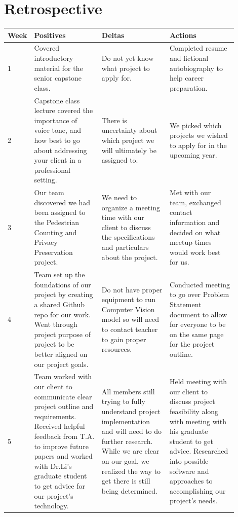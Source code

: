 \documentclass[onecolumn, draftclsnofoot,10pt, compsoc]{IEEEtran}
\begin{document}
\section{Retrospective}
\begin{center}
{
 \begin{tabular}{|l|p{0.3\linewidth}|p{0.3\linewidth}|p{0.3\linewidth}|}
 \hline
 Week & Positives & Deltas & Actions\\
 \hline
 1 & Covered introductory material for the senior capstone class.& Do not yet know what project to apply for.& Completed resume and fictional autobiography to help career preparation. \\
 \hline
 2 & Capstone class lecture covered the importance of voice tone, and how best to go about addressing your client in a professional setting.& There is uncertainty about which project we will ultimately be assigned to.& We picked which projects we wished to apply for in the upcoming year. \\
 \hline
 3 & Our team discovered we had been assigned to the Pedestrian Counting and Privacy Preservation project.& We need to organize a meeting time with our client to discuss the specifications and particulars about the project.& Met with our team, exchanged contact information and decided on what meetup times would work best for us. \\
 \hline
 4 & Team set up the foundations of our project by creating a shared Github repo for our work. Went through project purpose of project to be better aligned on our project goals.& Do not have proper equipment to run Computer Vision model so will need to contact teacher to gain proper resources.& Conducted meeting to go over Problem Statement document to allow for everyone to be on the same page for the project outline. \\
 \hline
 5 & Team worked with our client to communicate clear project outline and requirements. Received helpful feedback from T.A. to improve future papers and worked with Dr.Li's graduate student to get advice for our project's technology.& All members still trying to fully understand project implementation and will need to do further research. While we are clear on our goal, we realized the way to get there is still being determined.& Held meeting with our client to discuss project feasibility along with meeting with his graduate student to get advice. Researched into possible software and approaches to accomplishing our project's needs. \\
 \hline

\end{tabular}}
\end{center}
\end{document}
